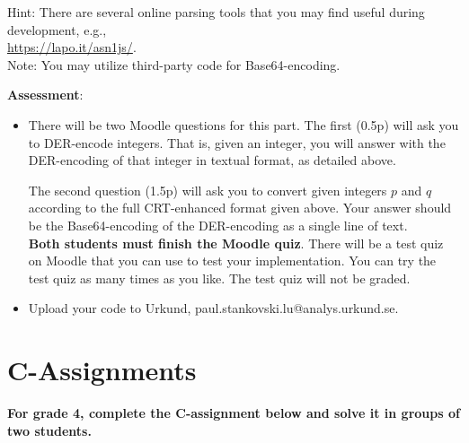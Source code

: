\documentclass{article}
\begin{document}
\begin{description}
{				Hint: There are several online parsing tools that you may find useful during development, e.g.,\\ 
				\url{https://lapo.it/asn1js/}.\\
				Note: You may utilize third-party code for Base64-encoding.
				
				\textbf{Assessment}:
				\begin{itemize}
					\item There will be two Moodle questions for this part. The first (0.5p) will ask you to DER-encode integers. That is, given an integer, you will answer with the DER-encoding of that integer in textual format, as detailed above.
					
					The second question (1.5p) will ask you to convert given integers $p$ and $q$ according to the full CRT-enhanced format given above. Your answer should be the Base64-encoding of the DER-encoding as a single line of text.\\
					\textbf{Both students must finish the Moodle quiz}.
					There will be a test quiz on Moodle that you can use to test your implementation. You can try the test quiz as many times as you like. The test quiz will not be graded.
					\item Upload your code to Urkund, paul.stankovski.lu@analys.urkund.se.
				\end{itemize}
			}
		\end{description}
		
		\section*{C-Assignments}
		\textbf{For grade 4, complete the C-assignment below and solve it in groups of two students.}
		
\end{document}

